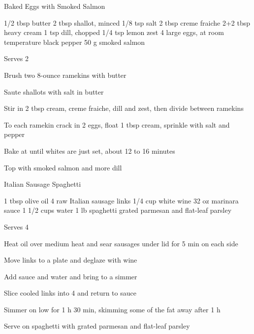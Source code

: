 \begin{recipe}{Baked Eggs with Smoked Salmon}{}
\begin{ingredients}
1/2 tbsp butter
2 tbsp shallot, minced
1/8 tsp salt
2 tbsp creme fraiche
2+2 tbsp heavy cream
1 tsp dill, chopped
1/4 tsp lemon zest
4 large eggs, at room temperature
black pepper
50 g smoked salmon
\end{ingredients}
\nextcolumn
Serves 2
\begin{steps}
    \item Brush two 8-ounce ramekins with butter
    \item Saute shallots with salt in butter
    \item Stir in 2 tbsp cream, creme fraiche, dill and zest, then divide between ramekins
    \item To each ramekin crack in 2 eggs, float 1 tbsp cream, sprinkle with salt and pepper
    \item Bake at  until whites are just set, about 12 to 16 minutes
    \item Top with smoked salmon and more dill
\end{steps}
\end{recipe}

\begin{denserecipe}{Italian Sausage Spaghetti}{}
\begin{ingredients}
1 tbsp olive oil
4 raw Italian sausage links
1/4 cup white wine
32 oz marinara sauce
1 1/2 cups water
1 lb spaghetti
grated parmesan and flat-leaf parsley
\end{ingredients}
\nextcolumn
Serves 4
\begin{steps}
    \item Heat oil over medium heat and sear sausages under lid for 5 min on each side
    \item Move links to a plate and deglaze with wine
    \item Add sauce and water and bring to a simmer
    \item Slice cooled links into 4 and return to sauce
    \item Simmer on low for 1 h 30 min, skimming some of the fat away after 1 h
    \item Serve on spaghetti with grated parmesan and flat-leaf parsley
\end{steps}
\end{denserecipe}

